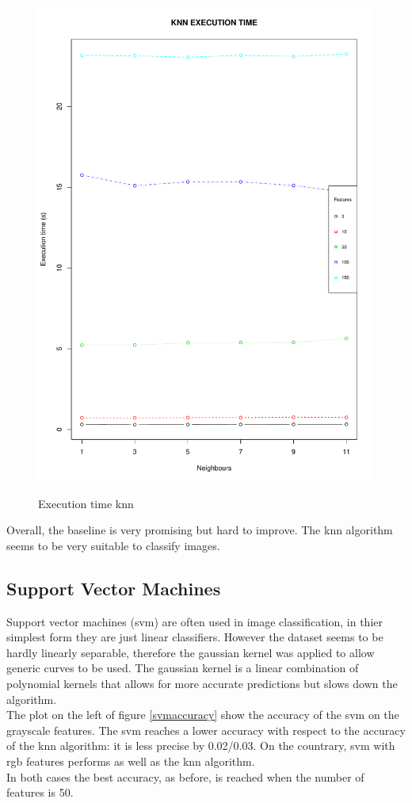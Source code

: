 \documentclass{article}
\begin{document}
\begin{figure}[H]
\begin{adjustwidth}{-4cm}{-4cm}
{    \includegraphics[scale=0.3]{../knn_time_rgb.pdf}  
     }
     \centering
     \caption{Execution time knn}
      \end{adjustwidth}
   \end{figure}
   
\noindent Overall, the baseline is very promising but hard to improve. The knn algorithm seems to be very suitable to classify images.

\subsection{Support Vector Machines}
Support vector machines (svm) are often used in image classification, in thier simplest form they are just linear classifiers. However the dataset seems to be hardly linearly separable, therefore the gaussian kernel was applied to allow generic curves to be used. The gaussian kernel is a linear combination of polynomial kernels that allows for more accurate predictions but slows down the algorithm.\\
The plot on the left of figure \ref{svmaccuracy} show the accuracy of the svm on the grayscale features. The svm reaches a lower accuracy with respect to the accuracy of the knn algorithm: it is less precise by 0.02/0.03. On the countrary, svm with rgb features performs as well as the knn algorithm.\\
In both cases the best accuracy, as before, is reached when the number of features is 50.
\end{document}
